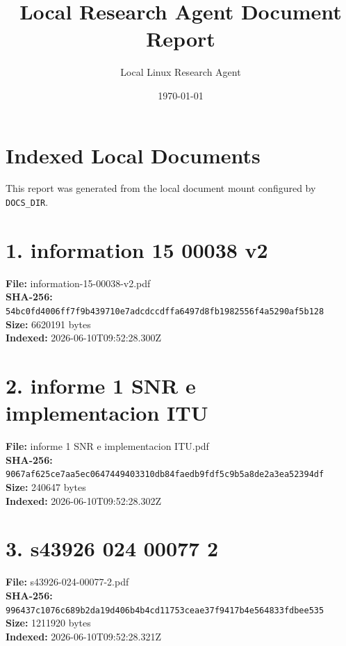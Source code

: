 \documentclass[11pt,a4paper]{article}
\title{Local Research Agent Document Report}
\author{Local Linux Research Agent}
\date{\today}
\begin{document}
\maketitle

\section*{Indexed Local Documents}
This report was generated from the local document mount configured by \texttt{DOCS\_DIR}.

\section*{1. information 15 00038 v2}
\textbf{File:} information-15-00038-v2.pdf\\
\textbf{SHA-256:} \texttt{54bc0fd4006ff7f9b439710e7adcdccdffa6497d8fb1982556f4a5290af5b128}\\
\textbf{Size:} 6620191 bytes\\
\textbf{Indexed:} 2026-06-10T09:52:28.300Z

\section*{2. informe 1 SNR e implementacion ITU}
\textbf{File:} informe 1 SNR e implementacion ITU.pdf\\
\textbf{SHA-256:} \texttt{9067af625ce7aa5ec0647449403310db84faedb9fdf5c9b5a8de2a3ea52394df}\\
\textbf{Size:} 240647 bytes\\
\textbf{Indexed:} 2026-06-10T09:52:28.302Z

\section*{3. s43926 024 00077 2}
\textbf{File:} s43926-024-00077-2.pdf\\
\textbf{SHA-256:} \texttt{996437c1076c689b2da19d406b4b4cd11753ceae37f9417b4e564833fdbee535}\\
\textbf{Size:} 1211920 bytes\\
\textbf{Indexed:} 2026-06-10T09:52:28.321Z
\end{document}
